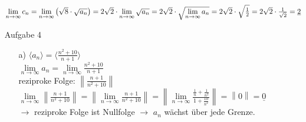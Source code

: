 \documentclass{scrreprt}
\begin{document}
\begin{enumerate}
{\begin{enumerate}
{                    $\lim \limits_{n \to \infty} c_n =
                    \lim \limits_{n \to \infty} \left( \sqrt{8} \cdot \sqrt{a_n}\right) =\\
                    2\sqrt{2} \cdot \lim \limits_{n \to \infty} \sqrt{a_n} =
                    2\sqrt{2} \cdot \sqrt{ \lim \limits_{n \to \infty} a_n } =\\
                    2\sqrt{2} \cdot \sqrt{\frac{1}{2}} =
                    2\sqrt{2} \cdot \frac{1}{\sqrt{2}} =
                    \underline{2}$\\
                }
            \end{enumerate}
        }
        \item[Aufgabe 4]{
            \begin{enumerate}
                \item [a)]{
                    $\langle a_n \rangle = \langle \frac{n^2 + 10}{n+1} \rangle$\\
                    $\lim \limits_{n \to \infty} a_n =
                    \lim \limits_{n \to \infty} \frac{n^2 + 10}{n+1}$\\
                    reziproke Folge: $\left\| \frac{n+1}{n^2 +10} \right\|$\\
                    $\lim \limits_{n \to \infty} \left\| \frac{n+1}{n^2 +10} \right\| =
                    \left\| \lim \limits_{n \to \infty} \frac{n+1}{n^2 +10} \right\| =
                    \left\| \lim \limits_{n \to \infty} \frac{\frac{1}{n}+\frac{1}{n^2}}{1 + \frac{10}{n^2}} \right\| =
                    \left\| 0 \right\| =
                    \underline{0}$\\
                    $\rightarrow$ reziproke Folge ist Nullfolge $\rightarrow$ $a_n$ wächst über jede Grenze.
                }
            \end{enumerate}
        }
    \end{enumerate}

    \newpage
    \setcounter{page}{1}
\end{document}
